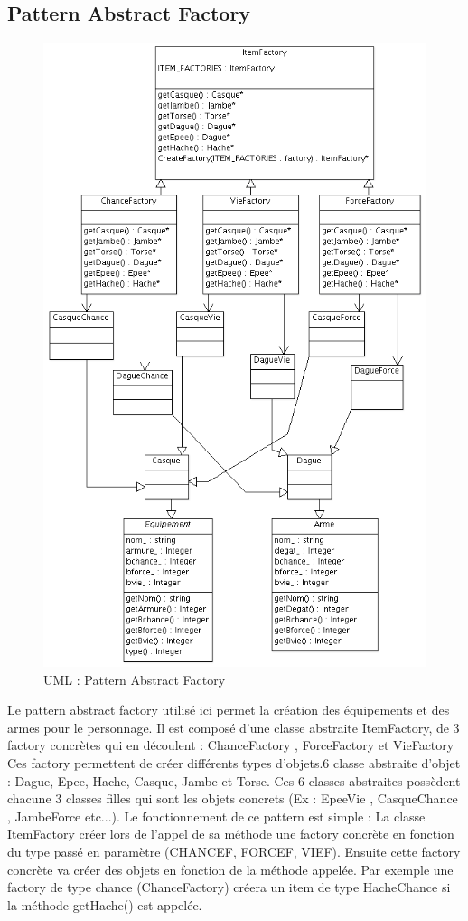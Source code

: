 \documentclass[a4paper]{article}
\begin{document}
    \subsection{Pattern Abstract Factory}
      \begin{figure}[h]
        \centering
        \includegraphics[width=11.5cm]{./Factory_UML.png}
        \caption{\label{fig:Factory_UML} UML : Pattern Abstract Factory}
      \end{figure}

Le pattern abstract factory utilisé ici permet la création des équipements et des armes pour le personnage.
Il est composé d'une classe abstraite ItemFactory, de 3 factory concrètes qui en découlent : ChanceFactory , ForceFactory et VieFactory
Ces factory permettent de créer différents types d'objets.6 classe abstraite d'objet : Dague, Epee, Hache, Casque, Jambe et Torse.
Ces 6 classes abstraites possèdent chacune 3 classes filles qui sont les objets concrets (Ex : EpeeVie , CasqueChance , JambeForce etc...).
Le fonctionnement de ce pattern est simple : La classe ItemFactory créer lors de l'appel de sa méthode une factory concrète en fonction du type passé en paramètre (CHANCEF, FORCEF, VIEF).
Ensuite cette factory concrète va créer des objets en fonction de la méthode appelée.
Par exemple une factory de type chance (ChanceFactory) créera un item de type HacheChance si la méthode getHache() est appelée.
\end{document}
